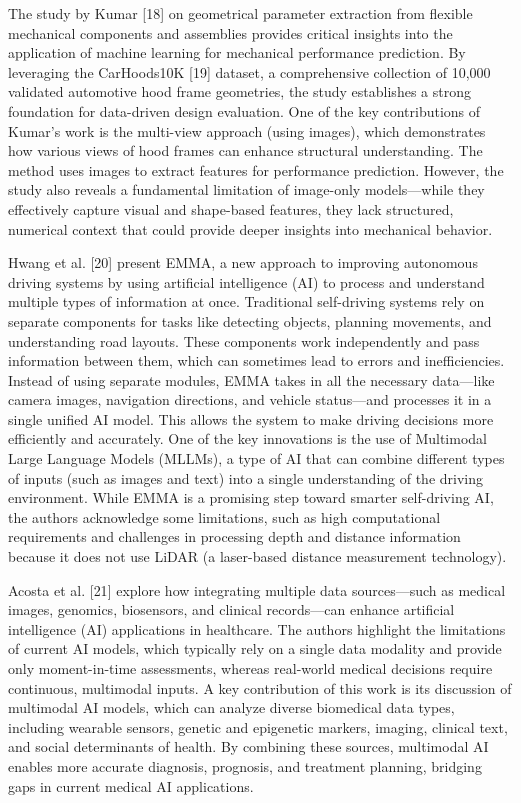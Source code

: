 \documentclass[11pt]{article}
\begin{document}
The study by Kumar {[}18{]} on geometrical parameter extraction from
flexible mechanical components and assemblies provides critical insights
into the application of machine learning for mechanical performance
prediction. By leveraging the CarHoods10K {[}19{]} dataset, a
comprehensive collection of 10,000 validated automotive hood frame
geometries, the study establishes a strong foundation for data-driven
design evaluation. One of the key contributions of Kumar's work is the
multi-view approach (using images), which demonstrates how various views
of hood frames can enhance structural understanding. The method uses
images to extract features for performance prediction. However, the
study also reveals a fundamental limitation of image-only models---while
they effectively capture visual and shape-based features, they lack
structured, numerical context that could provide deeper insights into
mechanical behavior.

Hwang et al. {[}20{]} present EMMA, a new approach to improving
autonomous driving systems by using artificial intelligence (AI) to
process and understand multiple types of information at once.
Traditional self-driving systems rely on separate components for tasks
like detecting objects, planning movements, and understanding road
layouts. These components work independently and pass information
between them, which can sometimes lead to errors and inefficiencies.
Instead of using separate modules, EMMA takes in all the necessary
data---like camera images, navigation directions, and vehicle
status---and processes it in a single unified AI model. This allows the
system to make driving decisions more efficiently and accurately. One of
the key innovations is the use of Multimodal Large Language Models
(MLLMs), a type of AI that can combine different types of inputs (such
as images and text) into a single understanding of the driving
environment. While EMMA is a promising step toward smarter self-driving
AI, the authors acknowledge some limitations, such as high computational
requirements and challenges in processing depth and distance information
because it does not use LiDAR (a laser-based distance measurement
technology).

Acosta et al. {[}21{]} explore how integrating multiple data
sources---such as medical images, genomics, biosensors, and clinical
records---can enhance artificial intelligence (AI) applications in
healthcare. The authors highlight the limitations of current AI models,
which typically rely on a single data modality and provide only
moment-in-time assessments, whereas real-world medical decisions require
continuous, multimodal inputs. A key contribution of this work is its
discussion of multimodal AI models, which can analyze diverse biomedical
data types, including wearable sensors, genetic and epigenetic markers,
imaging, clinical text, and social determinants of health. By combining
these sources, multimodal AI enables more accurate diagnosis, prognosis,
and treatment planning, bridging gaps in current medical AI
applications.
\end{document}
